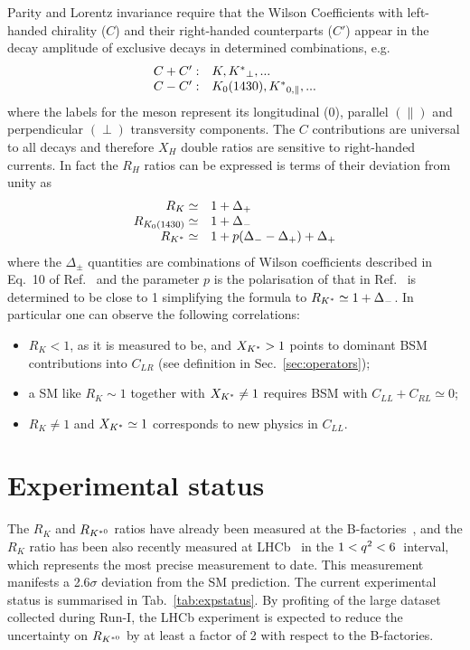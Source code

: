Parity and Lorentz invariance require that the Wilson Coefficients with left-handed chirality ($C$)
and their right-handed counterparts ($C'$) appear in the decay amplitude of exclusive decays in
determined combinations, e.g.
\begin{equation}
\begin{array}{ll}
C+C': & K, {{K}^*}_{\perp}, ...  \\
C-C': & K_0(1430), {{K}^*}_{0,\parallel}, ...
\end{array}
\end{equation}
where the labels for the \Kstar meson represent its longitudinal (0), parallel $(\parallel)$ and
perpendicular $(\perp)$ transversity components. The $C$ contributions are universal to
all decays and therefore $X_H$ double ratios are sensitive to right-handed currents.
In fact the $R_H$ ratios can be expressed is terms of their deviation from unity as
\begin{equation}
\begin{array}{rl}
R_K \simeq 			& 1+ \Delta_+ 		\\
R_{K_0(1430)} \simeq 	& 1+ \Delta_-		\\
R_{{K}^*} \simeq 		& 1+ p(\Delta_- - \Delta_+) + \Delta_+
\end{array}
\end{equation}
where the $\Delta_\pm$ quantities are combinations of Wilson coefficients
described in Eq.~10 of Ref.~\cite{Hiller:2014ula} and the parameter $p$ is the polarisation of \Kstar
that in Ref.~\cite{Hiller:2014ula} is determined to be close to 1 simplifying the formula to $R_{{{K}^*}} \simeq 1+ \Delta_-$.
In particular one can observe the following correlations: 
\begin{itemize}
\item $R_K < 1$, as it is measured to be, and $X_{{{K}^*}} > 1$ points to dominant BSM contributions into $C_{LR}$ (see definition in Sec.~\ref{sec:operators});
\item a SM like $R_K \sim 1$ together with $X_{{{K}^*}} \neq 1$ requires BSM with $C_{LL} + C_{RL} \simeq 0$;
\item $R_K \neq 1$ and $X_{{{K}^*}} \simeq 1$ corresponds to new physics in $C_{LL}$.
\end{itemize}

\section{Experimental status}

The $R_K$ and $R_{{{K}^{*0}}}$ ratios have already been measured at the B-factories~\cite{Lees:2012tva,Wei:2009zv},
and the $R_K$ ratio has been also recently measured at LHCb~\cite{Aaij:2014ora} in the $1 < {q^2} < 6$~\gevgevcccc \qsq interval, which represents the most precise measurement to date. This measurement manifests a 2.6$\sigma$
deviation from the SM prediction. 
The current experimental status is summarised in Tab.~\ref{tab:expstatus}. By profiting of the large dataset collected during Run-I, the LHCb experiment is expected
to reduce the uncertainty on $R_{{{K}^{*0}}}$ by at least a factor of 2 with respect to the B-factories.

